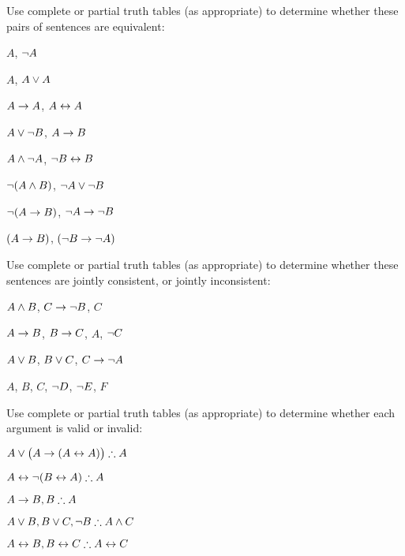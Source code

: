 \newpage
\practiceproblems



\problempart
\label{pr.TT.equiv}
Use complete or partial truth tables (as appropriate) to determine whether these pairs of sentences are equivalent:
\begin{earg}
\item $A$, $\neg A$ %
\item $A$, $A \vee A$ %
\item $A\rightarrow A$, $A \leftrightarrow A$ %
\item $A \vee \neg B$, $A\rightarrow B$ %
\item $A \wedge \neg A$, $\neg B \leftrightarrow B$ %
\item $\neg(A \wedge B)$, $\neg A \vee \neg B$ %
\item $\neg(A \rightarrow B)$, $\neg A \rightarrow \neg B$ %
\item $(A \rightarrow B)$, $(\neg B \rightarrow \neg A)$ %
\end{earg}


\problempart
\label{pr.TT.consistent.partial}
Use complete or partial truth tables (as appropriate) to determine whether these sentences are jointly consistent, or jointly inconsistent:
\begin{earg}
\item $A \wedge B$, $C\rightarrow \neg B$, $C$ %
\item $A\rightarrow B$, $B\rightarrow C$, $A$, $\neg C$ %
\item $A \vee B$, $B\vee C$, $C\rightarrow \neg A$ %
\item $A$, $B$, $C$, $\neg D$, $\neg E$, $F$ %
\end{earg}


\problempart
\label{pr.TT.valid.partial}
Use complete or partial truth tables (as appropriate) to determine whether each argument is valid or invalid:
\begin{earg}
\item $A\vee\bigl(A\rightarrow(A\leftrightarrow A) \bigr) \mathrel{\therefore} A$ %
\item $A\leftrightarrow\neg(B\leftrightarrow A) \mathrel{\therefore} A$ %
\item $A\rightarrow B, B \mathrel{\therefore} A$ %
\item $A\vee B, B\vee C, \neg B \mathrel{\therefore} A \wedge C$ %
\item $A\leftrightarrow B, B\leftrightarrow C \mathrel{\therefore} A\leftrightarrow C$ %
\end{earg}

